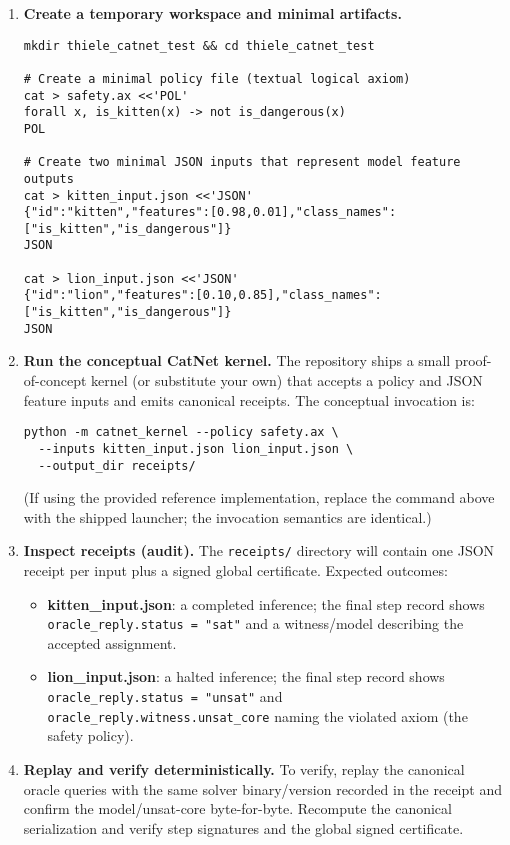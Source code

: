 \documentclass[11pt]{article}
\begin{document}
\begin{enumerate}
  \item \textbf{Create a temporary workspace and minimal artifacts.}
\begin{verbatim}
mkdir thiele_catnet_test && cd thiele_catnet_test

# Create a minimal policy file (textual logical axiom)
cat > safety.ax <<'POL'
forall x, is_kitten(x) -> not is_dangerous(x)
POL

# Create two minimal JSON inputs that represent model feature outputs
cat > kitten_input.json <<'JSON'
{"id":"kitten","features":[0.98,0.01],"class_names":["is_kitten","is_dangerous"]}
JSON

cat > lion_input.json <<'JSON'
{"id":"lion","features":[0.10,0.85],"class_names":["is_kitten","is_dangerous"]}
JSON
\end{verbatim}

  \item \textbf{Run the conceptual CatNet kernel.} The repository ships a small proof-of-concept kernel (or substitute your own) that accepts a policy and JSON feature inputs and emits canonical receipts. The conceptual invocation is:
\begin{verbatim}
python -m catnet_kernel --policy safety.ax \
  --inputs kitten_input.json lion_input.json \
  --output_dir receipts/
\end{verbatim}
(If using the provided reference implementation, replace the command above with the shipped launcher; the invocation semantics are identical.)

  \item \textbf{Inspect receipts (audit).} The \texttt{receipts/} directory will contain one JSON receipt per input plus a signed global certificate. Expected outcomes:
  \begin{itemize}
    \item \textbf{kitten\_input.json}: a completed inference; the final step record shows \texttt{oracle\_reply.status = "sat"} and a witness/model describing the accepted assignment.
    \item \textbf{lion\_input.json}: a halted inference; the final step record shows \texttt{oracle\_reply.status = "unsat"} and \texttt{oracle\_reply.witness.unsat\_core} naming the violated axiom (the safety policy).
  \end{itemize}

  \item \textbf{Replay and verify deterministically.} To verify, replay the canonical oracle queries with the same solver binary/version recorded in the receipt and confirm the model/unsat-core byte-for-byte. Recompute the canonical serialization and verify step signatures and the global signed certificate.
\end{enumerate}
\end{document}

